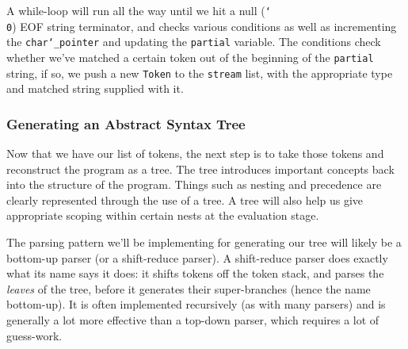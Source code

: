 \documentclass{article}
\newcommand{\code}[1]{\texttt{#1}}
\begin{document}
      A while-loop will run all the way until we hit a null (\code{\char`\\0})
      EOF string terminator, and checks various conditions as well as incrementing
      the \code{char\char`_pointer} and updating the \code{partial} variable.
      The conditions check whether we've matched a certain token out of the beginning
      of the \code{partial} string, if so, we push a new \code{Token} to the
      \code{stream} list, with the appropriate type and matched string supplied
      with it.

    \subsubsection{Generating an Abstract Syntax Tree}
      Now that we have our list of tokens, the next step is to take those tokens
      and reconstruct the program as a tree.  The tree introduces important
      concepts back into the structure of the program.  Things such as nesting
      and precedence are clearly represented through the use of a tree.  A tree
      will also help us give appropriate scoping within certain nests at the
      evaluation stage.

      The parsing pattern we'll be implementing for generating our tree will
      likely be a bottom-up parser (or a shift-reduce parser). A shift-reduce
      parser does exactly what its name says it does:
      it shifts tokens off the token stack, and parses the \emph{leaves} of the
      tree, before it generates their super-branches (hence the name bottom-up).
      It is often implemented recursively (as with many parsers) and is
      generally a lot more effective than a top-down parser, which requires a
      lot of guess-work.
\end{document}
